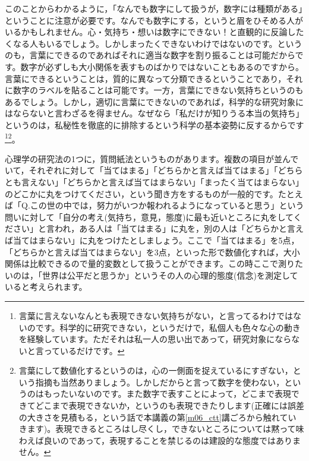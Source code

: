 \documentclass{ltjsbook}
\begin{document}
このことからわかるように，「なんでも数字にして扱うが，数字には種類がある」ということに注意が必要です。なんでも数字にする，というと眉をひそめる人がいるかもしれません。心・気持ち・想いは数字にできない！と直観的に反論したくなる人もいるでしょう。しかしまったくできないわけではないのです。というのも，言葉にできるのであればそれに適当な数字を割り振ることは可能だからです。数字が必ずしも大小関係を表すものばかりではないこともあるのですから。言葉にできるということは，質的に異なって分類できるということであり，それに数字のラベルを貼ることは可能です。一方，言葉にできない気持ちというのもあるでしょう。しかし，適切に言葉にできないのであれば，科学的な研究対象にはならないと言わざるを得ません。なぜなら「私だけが知りうる本当の気持ち」というのは，私秘性を徹底的に排除するという科学の基本姿勢に反するからです\footnote{言葉に言えないなんとも表現できない気持ちがない，と言ってるわけではないのです。科学的に研究できない，というだけで，私個人も色々な心の動きを経験しています。ただそれは私一人の思い出であって，研究対象にならないと言っているだけです。}\footnote{言葉にして数値化するというのは，心の一側面を捉えているにすぎない，という指摘も当然ありましょう。しかしだからと言って数字を使わない，というのはもったいないのです。また数字で表すことによって，どこまで表現できてどこまで表現できないか，というのも表現できたりします(正確には誤差の大きさを見積もる，という話で本講義の第\ref{m06_ctt}講ごろから触れていきます)。表現できるところはし尽くし，できないところについては黙って味わえば良いのであって，表現することを禁じるのは建設的な態度ではありません。}。

心理学の研究法の1つに，質問紙法というものがあります。複数の項目が並んでいて，それぞれに対して「当てはまる」「どちらかと言えば当てはまる」「どちらとも言えない」「どちらかと言えば当てはまらない」「まったく当てはまらない」のどこかに丸をつけてください，という聞き方をするものが一般的です。たとえば「Q.この世の中では，努力がいつか報われるようになっていると思う」という問いに対して「自分の考え(気持ち，意見，態度)に最も近いところに丸をしてください」と言われ，ある人は「当てはまる」に丸を，別の人は「どちらかと言えば当てはまらない」に丸をつけたとしましょう。ここで「当てはまる」を5点，「どちらかと言えば当てはまらない」を3点，といった形で数値化すれば，大小関係は比較できるので量的変数として扱うことができます。この時ここで測りたいのは，「世界は公平だと思うか」というその人の心理的態度(信念)を測定していると考えられます。
\end{document}

